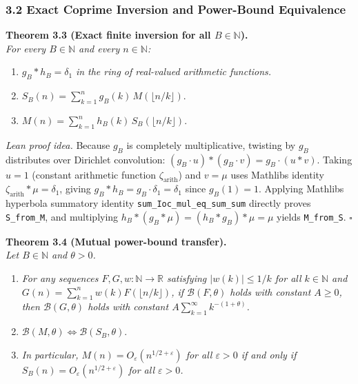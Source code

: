 \documentclass[11pt]{article}
\providecommand{\tightlist}{\setlength{\itemsep}{0pt}\setlength{\parskip}{0pt}}
\begin{document}
\subsubsection{3.2 Exact Coprime Inversion and Power-Bound Equivalence}\label{32-exact-coprime-inversion-and-power-bound-equivalence}

\textbf{Theorem 3.3 (Exact finite inversion for all \(B \in \mathbb{N}\)).}\\
\emph{For every \(B \in \mathbb{N}\) and every \(n \in \mathbb{N}\):}

\begin{enumerate}
\def\labelenumi{\arabic{enumi}.}
\tightlist
\item
  \(g_B * h_B = \delta_1\) \emph{in the ring of real-valued arithmetic functions.}
\item
  \(S_B(n) = \sum_{k=1}^{n} g_B(k)\, M(\lfloor n/k \rfloor)\).
\item
  \(M(n) = \sum_{k=1}^{n} h_B(k)\, S_B(\lfloor n/k \rfloor)\).
\end{enumerate}

\emph{Lean proof idea.} Because \(g_B\) is completely multiplicative, twisting by \(g_B\) distributes over Dirichlet convolution: \((g_B \cdot u) * (g_B \cdot v) = g_B \cdot (u * v)\). Taking \(u = 1\) (constant arithmetic function \(\zeta_{\mathrm{arith}}\)) and \(v = \mu\) uses Mathlib\textquotesingle s identity \(\zeta_{\mathrm{arith}} * \mu = \delta_1\), giving \(g_B * h_B = g_B \cdot \delta_1 = \delta_1\) since \(g_B(1) = 1\). Applying Mathlib\textquotesingle s hyperbola summatory identity \texttt{sum\_Ioc\_mul\_eq\_sum\_sum} directly proves \texttt{S\_from\_M}, and multiplying \(h_B * (g_B * \mu) = (h_B * g_B) * \mu = \mu\) yields \texttt{M\_from\_S}. \(\square\)

\textbf{Theorem 3.4 (Mutual power-bound transfer).}\\
\emph{Let \(B \in \mathbb{N}\) and \(\theta > 0\).}

\begin{enumerate}
\def\labelenumi{\arabic{enumi}.}
\tightlist
\item
  \emph{For any sequences \(F, G, w : \mathbb{N} \to \mathbb{R}\) satisfying \(|w(k)| \le 1/k\) for all \(k \in \mathbb{N}\) and \(G(n) = \sum_{k=1}^n w(k) F(\lfloor n/k \rfloor)\), if \(\mathcal{B}(F, \theta)\) holds with constant \(A \ge 0\), then \(\mathcal{B}(G, \theta)\) holds with constant \(A \sum_{k=1}^{\infty} k^{-(1+\theta)}\).}
\item
  \(\mathcal{B}(M, \theta) \iff \mathcal{B}(S_B, \theta)\).
\item
  \emph{In particular, \(M(n) = O_\varepsilon(n^{1/2+\varepsilon})\) for all \(\varepsilon > 0\) if and only if \(S_B(n) = O_\varepsilon(n^{1/2+\varepsilon})\) for all \(\varepsilon > 0\).}
\end{enumerate}
\end{document}
